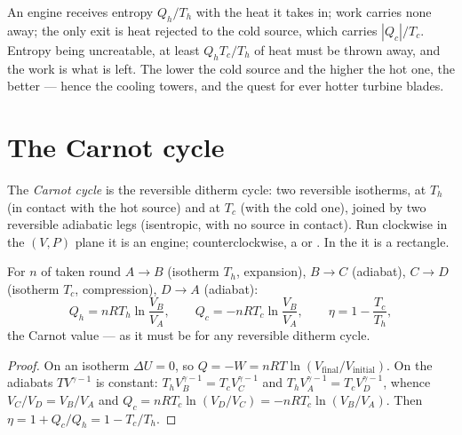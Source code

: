 \begin{remark}\label{rem:b1:heat-engines:why}
An engine receives entropy $Q_h/T_h$ with the heat it takes in; work
carries none away; the only exit is heat rejected to the cold source,
which carries $|Q_c|/T_c$. Entropy being uncreatable, at least
$Q_h T_c/T_h$ of heat must be thrown away, and the work is what is left.
The lower the cold source and the higher the hot one, the better --- hence
the cooling towers, and the quest for ever hotter turbine blades.
\end{remark}

\section{The Carnot cycle}

\begin{definition}\label{def:b1:heat-engines:carnotcycle}
The \emph{Carnot cycle} is the reversible ditherm cycle: two reversible
isotherms, at $T_h$ (in contact with the hot source) and at $T_c$ (with
the cold one), joined by two reversible adiabatic legs (isentropic,
with no source in contact). Run clockwise in the $(V, P)$ plane it is an
engine; counterclockwise, a  or . In the  it is a rectangle.
\end{definition}

\begin{proposition}\label{prop:b1:heat-engines:carnotgas}
For $n$  of  taken round $A \to B$ (isotherm $T_h$,
expansion), $B \to C$ (adiabat), $C \to D$ (isotherm $T_c$,
compression), $D \to A$ (adiabat):
\[
Q_h = nRT_h\ln\frac{V_B}{V_A}, \qquad
Q_c = -nRT_c\ln\frac{V_B}{V_A}, \qquad
\eta = 1 - \frac{T_c}{T_h} ,
\]
the Carnot value --- as it must be for any reversible ditherm cycle.
\end{proposition}

\begin{proof}
On an isotherm $\Delta U = 0$, so $Q = -W = nRT\ln(V_{\text{final}}/
V_{\text{initial}})$. On the adiabats $TV^{\gamma-1}$ is constant:
$T_hV_B^{\gamma-1} = T_cV_C^{\gamma-1}$ and $T_hV_A^{\gamma-1} =
T_cV_D^{\gamma-1}$, whence $V_C/V_D = V_B/V_A$ and $Q_c = nRT_c\ln(V_D/V_C) =
-nRT_c\ln(V_B/V_A)$. Then $\eta = 1 + Q_c/Q_h = 1 - T_c/T_h$.
\end{proof}

